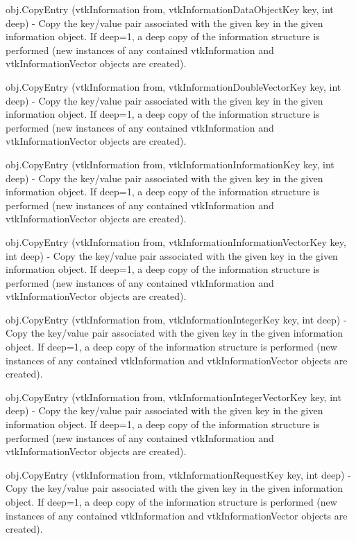 \begin{DoxyItemize}
\item {\ttfamily obj.\-Copy\-Entry (vtk\-Information from, vtk\-Information\-Data\-Object\-Key key, int deep)} -\/ Copy the key/value pair associated with the given key in the given information object. If deep=1, a deep copy of the information structure is performed (new instances of any contained vtk\-Information and vtk\-Information\-Vector objects are created).  
\item {\ttfamily obj.\-Copy\-Entry (vtk\-Information from, vtk\-Information\-Double\-Vector\-Key key, int deep)} -\/ Copy the key/value pair associated with the given key in the given information object. If deep=1, a deep copy of the information structure is performed (new instances of any contained vtk\-Information and vtk\-Information\-Vector objects are created).  
\item {\ttfamily obj.\-Copy\-Entry (vtk\-Information from, vtk\-Information\-Information\-Key key, int deep)} -\/ Copy the key/value pair associated with the given key in the given information object. If deep=1, a deep copy of the information structure is performed (new instances of any contained vtk\-Information and vtk\-Information\-Vector objects are created).  
\item {\ttfamily obj.\-Copy\-Entry (vtk\-Information from, vtk\-Information\-Information\-Vector\-Key key, int deep)} -\/ Copy the key/value pair associated with the given key in the given information object. If deep=1, a deep copy of the information structure is performed (new instances of any contained vtk\-Information and vtk\-Information\-Vector objects are created).  
\item {\ttfamily obj.\-Copy\-Entry (vtk\-Information from, vtk\-Information\-Integer\-Key key, int deep)} -\/ Copy the key/value pair associated with the given key in the given information object. If deep=1, a deep copy of the information structure is performed (new instances of any contained vtk\-Information and vtk\-Information\-Vector objects are created).  
\item {\ttfamily obj.\-Copy\-Entry (vtk\-Information from, vtk\-Information\-Integer\-Vector\-Key key, int deep)} -\/ Copy the key/value pair associated with the given key in the given information object. If deep=1, a deep copy of the information structure is performed (new instances of any contained vtk\-Information and vtk\-Information\-Vector objects are created).  
\item {\ttfamily obj.\-Copy\-Entry (vtk\-Information from, vtk\-Information\-Request\-Key key, int deep)} -\/ Copy the key/value pair associated with the given key in the given information object. If deep=1, a deep copy of the information structure is performed (new instances of any contained vtk\-Information and vtk\-Information\-Vector objects are created).  

\end{DoxyItemize}

